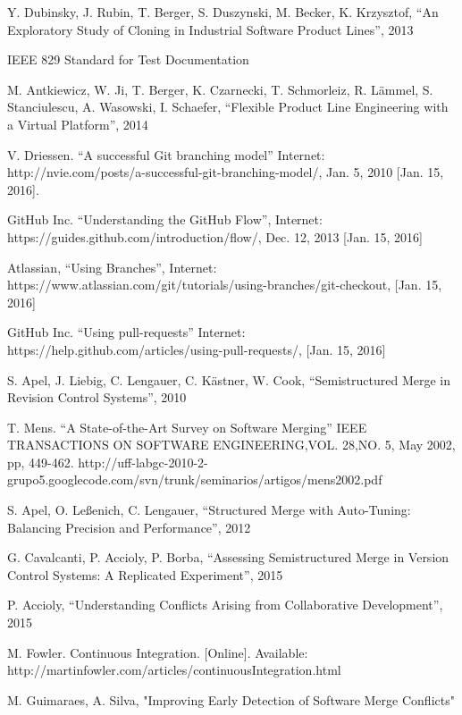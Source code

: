 \begin{thebibliography}{69}
 Y. Dubinsky, J. Rubin, T. Berger, S. Duszynski, M. Becker, K. Krzysztof, “An Exploratory Study of Cloning in Industrial Software Product Lines”, 2013

 IEEE 829 Standard for Test Documentation

 M. Antkiewicz, W. Ji, T. Berger, K. Czarnecki, T. Schmorleiz, R. Lämmel, S. Stanciulescu, A. Wasowski, I. Schaefer, “Flexible Product Line Engineering with a Virtual Platform”, 2014

 V. Driessen. “A successful Git branching model” Internet: http://nvie.com/posts/a-successful-git-branching-model/, Jan. 5, 2010 [Jan. 15, 2016].

 GitHub Inc. “Understanding the GitHub Flow”, Internet: https://guides.github.com/introduction/flow/, Dec. 12, 2013 [Jan. 15, 2016]

 Atlassian, “Using Branches”, Internet: https://www.atlassian.com/git/tutorials/using-branches/git-checkout, [Jan. 15, 2016]

 GitHub Inc. “Using pull-requests” Internet: https://help.github.com/articles/using-pull-requests/, [Jan. 15, 2016]

 S. Apel, J. Liebig, C. Lengauer, C. Kästner, W. Cook, “Semistructured Merge in Revision Control Systems”, 2010

 T. Mens. “A State-of-the-Art Survey on Software Merging” IEEE TRANSACTIONS ON SOFTWARE ENGINEERING,VOL. 28,NO. 5, May 2002, pp, 449-462.
http://uff-labgc-2010-2-grupo5.googlecode.com/svn/trunk/seminarios/artigos/mens2002.pdf

 S. Apel, O. Leßenich, C. Lengauer, “Structured Merge with Auto-Tuning: Balancing Precision and Performance”, 2012

 G. Cavalcanti, P. Accioly, P. Borba, “Assessing Semistructured Merge in Version Control Systems: A Replicated Experiment”, 2015

 P. Accioly, “Understanding Conflicts Arising from Collaborative Development”, 2015

 M. Fowler. Continuous Integration. [Online]. Available:
http://martinfowler.com/articles/continuousIntegration.html

 M. Guimaraes, A. Silva, "Improving Early Detection of Software Merge Conflicts"

\end{thebibliography}
